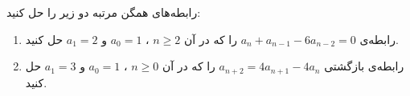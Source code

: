     \p 
رابطه‌های همگن مرتبه دو زیر را حل کنید:
\begin{enumerate}
\item
رابطه‌ی
$a_n + a_{n-1} - 6a_{n-2} = 0$
را که در آن
$n \geq 2$
،
$a_0 = 1$
و
$a_1 = 2$
حل کنید.
\item
رابطه‌ی بازگشتی
$a_{n+2} = 4a_{n+1} - 4a_n$
را که در آن
$n \geq 0$
،
$a_0 = 1$
و
$a_1 = 3$
حل کنید.
\end{enumerate}